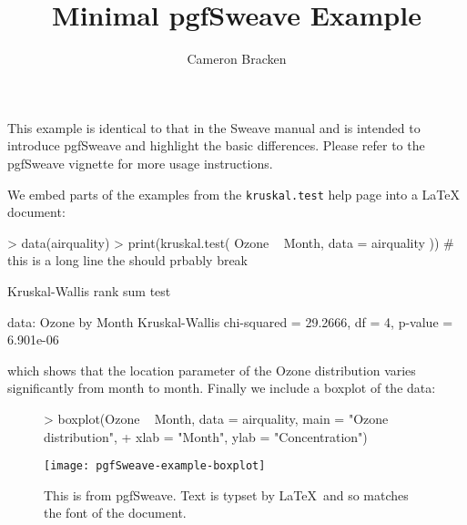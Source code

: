 \documentclass{article}
\title{Minimal pgfSweave Example}
\author{Cameron Bracken}
\begin{document}
\maketitle
This example is identical to that in the Sweave manual and is intended to 
introduce pgfSweave and highlight the basic differences.  Please refer to 
the pgfSweave vignette for more usage instructions. 

We embed parts of the examples from the \texttt{kruskal.test} help page 
into a \LaTeX{} document:

\begin{Schunk}
\begin{Sinput}
>     data(airquality)
>     print(kruskal.test( Ozone ~ Month, data = airquality )) # this is a long line the should prbably break
\end{Sinput}
\begin{Soutput}
	Kruskal-Wallis rank sum test

data:  Ozone by Month 
Kruskal-Wallis chi-squared = 29.2666, df = 4, p-value = 6.901e-06
\end{Soutput}
\end{Schunk}
\noindent which shows that the location parameter of the Ozone distribution varies 
significantly from month to month. Finally we include a boxplot of the data:

\begin{figure}[!ht]
\begin{Schunk}
\begin{Sinput}
> boxplot(Ozone ~ Month, data = airquality, main = "Ozone distribution", 
+     xlab = "Month", ylab = "Concentration")
\end{Sinput}
\end{Schunk}
\texttt{[image: pgfSweave-example-boxplot]}
\caption{This is from pgfSweave. Text is typset by \LaTeX\ and so matches the
 font of the document.}
\end{figure}
\end{document}
